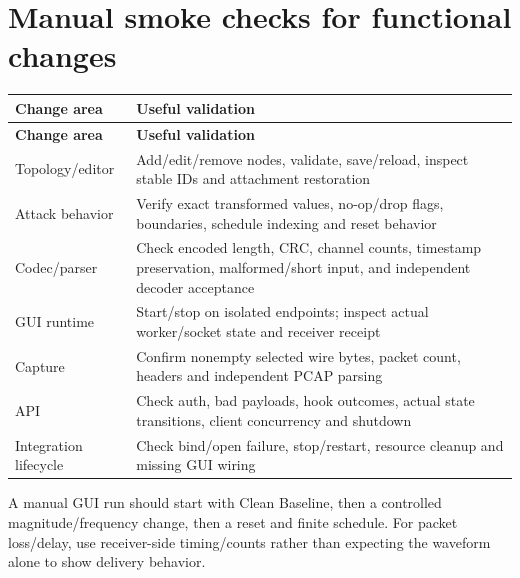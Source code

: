 \section*{Manual smoke checks for functional changes}
\begingroup
\fontsize{8.7}{11.8}\selectfont
\setlength{\tabcolsep}{5pt}
\renewcommand{\arraystretch}{1.23}
\begin{longtable}{@{}>{\raggedright\arraybackslash}p{}>{\raggedright\arraybackslash}p{}@{}}
\rowcolor{navy} \color{white}\bfseries Change area & \color{white}\bfseries Useful validation \\
\endfirsthead
\rowcolor{navy} \color{white}\bfseries Change area & \color{white}\bfseries Useful validation \\
\endhead
\endfoot
\rowcolor{pale}
Topology/editor & Add/edit/remove nodes, validate, save/reload, inspect stable IDs and attachment restoration \\
Attack behavior & Verify exact transformed values, no-op/drop flags, boundaries, schedule indexing and reset behavior \\
\rowcolor{pale}
Codec/parser & Check encoded length, CRC, channel counts, timestamp preservation, malformed/short input, and independent decoder acceptance \\
GUI runtime & Start/stop on isolated endpoints; inspect actual worker/socket state and receiver receipt \\
\rowcolor{pale}
Capture & Confirm nonempty selected wire bytes, packet count, headers and independent PCAP parsing \\
API & Check auth, bad payloads, hook outcomes, actual state transitions, client concurrency and shutdown \\
\rowcolor{pale}
Integration lifecycle & Check bind/open failure, stop/restart, resource cleanup and missing GUI wiring \\
\end{longtable}
\endgroup

A manual GUI run should start with Clean Baseline, then a controlled magnitude/frequency change, then a reset and finite schedule. For packet loss/delay, use receiver-side timing/counts rather than expecting the waveform alone to show delivery behavior.

